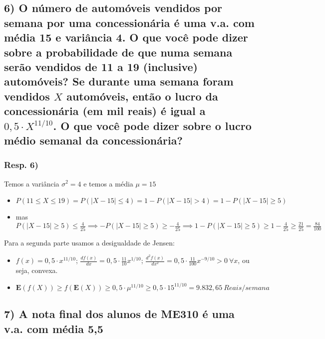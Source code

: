 \documentclass[english]{article}
\begin{document}
\subsection*{\textcompwordmark{}}


\subsection*{\textmd{6) O número de automóveis vendidos por semana por uma concessionária
é uma v.a. com média 15 e variância 4. O que você pode dizer sobre
a probabilidade de que numa semana serão vendidos de 11 a 19 (inclusive)
automóveis? Se durante uma semana foram vendidos $X$ automóveis,
então o lucro da concessionária (em mil reais) é igual a $0,5\cdot X^{11/10}$.
O que você pode dizer sobre o lucro médio semanal da concessionária?}}


\subsubsection*{\textmd{Resp. 6)}}

Temos a variância $\sigma^{2}=4$ e temos a média $\mu=15$
\begin{itemize}
\item $P(11\le X\le19)=P(\left|X-15\right|\le4)=1-P(\left|X-15\right|>4)=1-P(\left|X-15\right|\ge5)$
\item mas $P(\left|X-15\right|\ge5)\le\frac{4}{25}\implies-P(\left|X-15\right|\ge5)\ge-\frac{4}{25}\implies1-P(\left|X-15\right|\ge5)\ge1-\frac{4}{25}\ge\frac{21}{25}=\frac{84}{100}$
\end{itemize}
Para a segunda parte usamos a desigualdade de Jensen:
\begin{itemize}
\item $f(x)=0,5\cdot x^{11/10}$; $\frac{df(x)}{dx}=0,5\cdot\frac{11}{10}x^{1/10}$;
$\frac{d^{2}f(x)}{dx^{2}}=0,5\cdot\frac{11}{100}x^{-9/10}>0\ \forall x$,
ou seja, convexa.
\item $\mathbf{E}(f(X))\ge f(\mathbf{E}(X))\ge0,5\cdot\mu^{11/10}\ge0,5\cdot15^{11/10}=9.832,65\ Reais/semana$
\end{itemize}

\subsection*{\textcompwordmark{}}


\subsection*{\textmd{7) A nota final dos alunos de ME310 é uma v.a. com média
5,5}}
\end{document}
